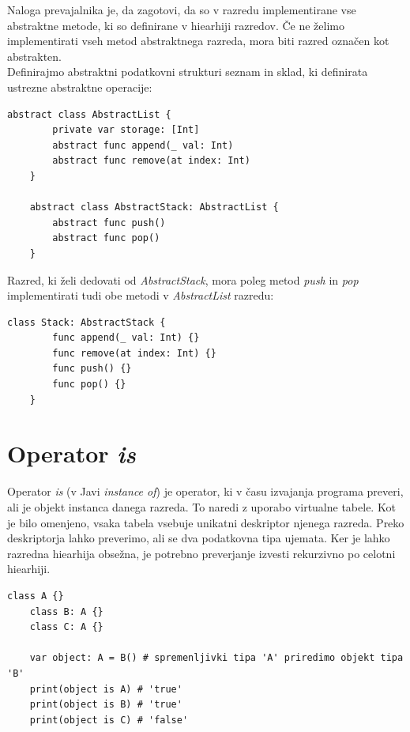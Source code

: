 \documentclass[a4paper, 12p]{book}
\begin{document}
Naloga prevajalnika je, da zagotovi, da so v razredu implementirane vse abstraktne metode, ki so definirane v hiearhiji razredov. Če ne želimo implementirati vseh metod abstraktnega razreda, mora biti razred označen kot abstrakten. \\
\indent Definirajmo abstraktni podatkovni strukturi seznam in sklad, ki definirata ustrezne abstraktne operacije:

\begin{lstlisting}[caption={}, captionpos=b]
	abstract class AbstractList {
	    private var storage: [Int]
	    abstract func append(_ val: Int)
	    abstract func remove(at index: Int)
	}
	
	abstract class AbstractStack: AbstractList {
	    abstract func push()
	    abstract func pop()
	}
\end{lstlisting}

Razred, ki želi dedovati od \textit{AbstractStack}, mora poleg metod \textit{push} in \textit{pop} implementirati tudi obe metodi v \textit{AbstractList} razredu:

\begin{lstlisting}[caption={Implementacija abstraktne podaktovne strukture.}, captionpos=b]
	class Stack: AbstractStack {
	    func append(_ val: Int) {}
	    func remove(at index: Int) {}
	    func push() {}
	    func pop() {}
	}
\end{lstlisting}

\section{Operator \textit{is}}

Operator \textit{is} (v Javi \textit{instance of}) je operator, ki v času izvajanja programa preveri, ali je objekt instanca danega razreda. To naredi z uporabo virtualne tabele. Kot je bilo omenjeno, vsaka tabela vsebuje unikatni deskriptor njenega razreda. Preko deskriptorja lahko preverimo, ali se dva podatkovna tipa ujemata. Ker je lahko razredna hiearhija obsežna, je potrebno preverjanje izvesti rekurzivno po celotni hiearhiji.

\begin{lstlisting}[caption={Uporaba operatorja \textit{is}.}, captionpos=b]
	class A {}
	class B: A {}
	class C: A {}
	
	var object: A = B() # spremenljivki tipa 'A' priredimo objekt tipa 'B'
	print(object is A) # 'true'
	print(object is B) # 'true'
	print(object is C) # 'false'
\end{lstlisting}
\end{document}
